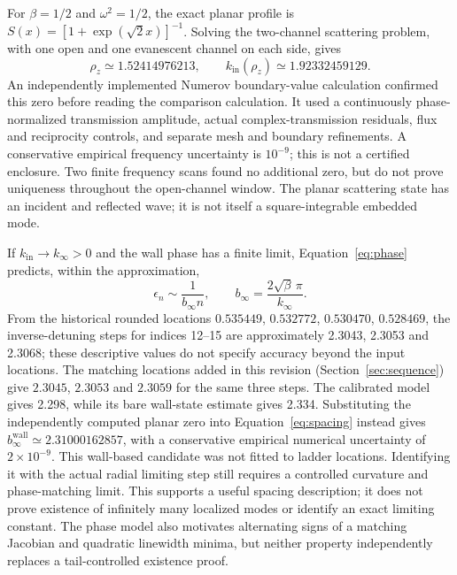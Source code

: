 For $\beta=1/2$ and $\omega^2=1/2$, the exact planar profile is
$S(x)=[1+\exp(\sqrt2 x)]^{-1}$. Solving the two-channel scattering
problem, with one open and one evanescent channel on each side, gives
\begin{equation}\label{eq:planarzero}
\rho_z\simeq1.52414976213,\qquad
k_{\mathrm{in}}(\rho_z)\simeq1.92332459129.
\end{equation}
An independently implemented Numerov boundary-value calculation confirmed
this zero before reading the comparison calculation. It used a continuously
phase-normalized transmission amplitude, actual complex-transmission
residuals, flux and reciprocity controls, and separate mesh and boundary
refinements. A conservative empirical frequency uncertainty is $10^{-9}$;
this is not a certified enclosure. Two finite frequency scans found no
additional zero, but do not prove uniqueness throughout the open-channel
window. The planar scattering state has an incident and reflected wave;
it is not itself a square-integrable embedded mode.

If $k_{\mathrm{in}}\to k_\infty>0$ and the wall phase has a finite limit,
Equation~\eqref{eq:phase} predicts, within the approximation,
\begin{equation}\label{eq:spacing}
\epsilon_n\sim\frac1{b_\infty n},\qquad
b_\infty=\frac{2\sqrt\beta\,\pi}{k_\infty}.
\end{equation}
From the historical rounded locations $0.535449$, $0.532772$,
$0.530470$, $0.528469$, the inverse-detuning steps for indices 12--15
are approximately 2.3043, 2.3053 and 2.3068;
these descriptive values do not specify accuracy beyond the input locations.
The matching locations added in this revision (Section~\ref{sec:sequence})
give $2.3045$, $2.3053$ and $2.3059$ for the same three steps.
The calibrated model gives 2.298, while its bare
wall-state estimate gives 2.334. Substituting the independently computed
planar zero into Equation~\eqref{eq:spacing} instead gives
$b_\infty^{\mathrm{wall}}\simeq2.31000162857$, with a conservative empirical
numerical uncertainty of $2\times10^{-9}$. This wall-based candidate was not
fitted to ladder locations. Identifying it with the actual radial limiting
step still requires a controlled curvature and phase-matching limit.
This supports a useful spacing description;
it does not prove existence of infinitely many localized modes or identify
an exact limiting constant. The phase model also motivates alternating
signs of a matching Jacobian and quadratic linewidth minima, but neither
property independently replaces a tail-controlled existence proof.

